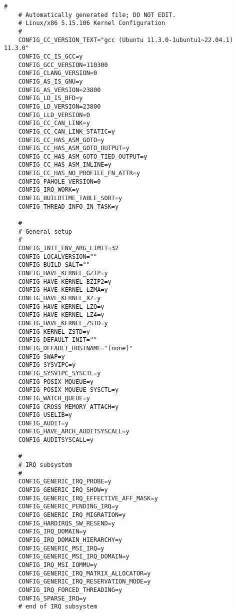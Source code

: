 \begin{multicols}{2}
\begin{lstlisting}[caption=kernel config,label=kconfig,]
    #
    # Automatically generated file; DO NOT EDIT.
    # Linux/x86 5.15.106 Kernel Configuration
    #
    CONFIG_CC_VERSION_TEXT="gcc (Ubuntu 11.3.0-1ubuntu1~22.04.1) 11.3.0"
    CONFIG_CC_IS_GCC=y
    CONFIG_GCC_VERSION=110300
    CONFIG_CLANG_VERSION=0
    CONFIG_AS_IS_GNU=y
    CONFIG_AS_VERSION=23800
    CONFIG_LD_IS_BFD=y
    CONFIG_LD_VERSION=23800
    CONFIG_LLD_VERSION=0
    CONFIG_CC_CAN_LINK=y
    CONFIG_CC_CAN_LINK_STATIC=y
    CONFIG_CC_HAS_ASM_GOTO=y
    CONFIG_CC_HAS_ASM_GOTO_OUTPUT=y
    CONFIG_CC_HAS_ASM_GOTO_TIED_OUTPUT=y
    CONFIG_CC_HAS_ASM_INLINE=y
    CONFIG_CC_HAS_NO_PROFILE_FN_ATTR=y
    CONFIG_PAHOLE_VERSION=0
    CONFIG_IRQ_WORK=y
    CONFIG_BUILDTIME_TABLE_SORT=y
    CONFIG_THREAD_INFO_IN_TASK=y
    
    #
    # General setup
    #
    CONFIG_INIT_ENV_ARG_LIMIT=32
    CONFIG_LOCALVERSION=""
    CONFIG_BUILD_SALT=""
    CONFIG_HAVE_KERNEL_GZIP=y
    CONFIG_HAVE_KERNEL_BZIP2=y
    CONFIG_HAVE_KERNEL_LZMA=y
    CONFIG_HAVE_KERNEL_XZ=y
    CONFIG_HAVE_KERNEL_LZO=y
    CONFIG_HAVE_KERNEL_LZ4=y
    CONFIG_HAVE_KERNEL_ZSTD=y
    CONFIG_KERNEL_ZSTD=y
    CONFIG_DEFAULT_INIT=""
    CONFIG_DEFAULT_HOSTNAME="(none)"
    CONFIG_SWAP=y
    CONFIG_SYSVIPC=y
    CONFIG_SYSVIPC_SYSCTL=y
    CONFIG_POSIX_MQUEUE=y
    CONFIG_POSIX_MQUEUE_SYSCTL=y
    CONFIG_WATCH_QUEUE=y
    CONFIG_CROSS_MEMORY_ATTACH=y
    CONFIG_USELIB=y
    CONFIG_AUDIT=y
    CONFIG_HAVE_ARCH_AUDITSYSCALL=y
    CONFIG_AUDITSYSCALL=y
    
    #
    # IRQ subsystem
    #
    CONFIG_GENERIC_IRQ_PROBE=y
    CONFIG_GENERIC_IRQ_SHOW=y
    CONFIG_GENERIC_IRQ_EFFECTIVE_AFF_MASK=y
    CONFIG_GENERIC_PENDING_IRQ=y
    CONFIG_GENERIC_IRQ_MIGRATION=y
    CONFIG_HARDIRQS_SW_RESEND=y
    CONFIG_IRQ_DOMAIN=y
    CONFIG_IRQ_DOMAIN_HIERARCHY=y
    CONFIG_GENERIC_MSI_IRQ=y
    CONFIG_GENERIC_MSI_IRQ_DOMAIN=y
    CONFIG_IRQ_MSI_IOMMU=y
    CONFIG_GENERIC_IRQ_MATRIX_ALLOCATOR=y
    CONFIG_GENERIC_IRQ_RESERVATION_MODE=y
    CONFIG_IRQ_FORCED_THREADING=y
    CONFIG_SPARSE_IRQ=y
    # end of IRQ subsystem
    

\end{lstlisting}
\end{multicols}
